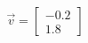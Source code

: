 \documentclass[preview]{standalone}
\begin{document}
\begin{align*}
\vec{v}=\begin{bmatrix}-0.2\\1.8\end{bmatrix}
\end{align*}
\end{document}
